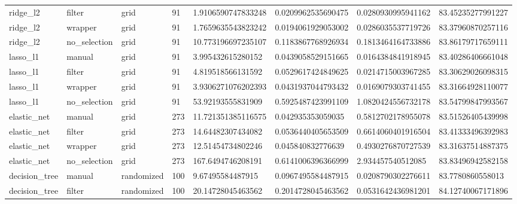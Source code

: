 {\begin{longtable}[c]{@{}llllllll@{}}
	\rowcolor[HTML]{EFEFEF} 
	ridge\_l2          & filter        & grid       & 91  & 1.9106590747833248     & 0.0209962535690475     & 0.0280930995941162     & 83.45235277991227  \\
	ridge\_l2          & wrapper       & grid       & 91  & 1.7659635543823242     & 0.0194061929053002     & 0.0286035537719726     & 83.37960870257116  \\
	\rowcolor[HTML]{EFEFEF} 
	ridge\_l2          & no\_selection & grid       & 91  & 10.773196697235107     & 0.1183867768926934     & 0.1813464164733886     & 83.86179717659111  \\* \midrule
	lasso\_l1          & manual        & grid       & 91  & 3.995432615280152      & 0.0439058529151665     & 0.0164384841918945     & 83.40286406661048  \\
	\rowcolor[HTML]{EFEFEF} 
	lasso\_l1          & filter        & grid       & 91  & 4.819518566131592      & 0.0529617424849625     & 0.0214715003967285     & 83.30629026098315  \\
	lasso\_l1          & wrapper       & grid       & 91  & 3.9306271076202393     & 0.0431937044793432     & 0.0169079303741455     & 83.31664928110077  \\
	\rowcolor[HTML]{EFEFEF} 
	lasso\_l1          & no\_selection & grid       & 91  & 53.92193555831909      & 0.5925487423991109     & 1.0820424556732178     & 83.54799847993567  \\* \midrule
	elastic\_net       & manual        & grid       & 273 & 11.721351385116575     & 0.042935353059035      & 0.5812702178955078     & 83.51526405439998  \\
	\rowcolor[HTML]{EFEFEF} 
	elastic\_net       & filter        & grid       & 273 & 14.64482307434082      & 0.0536440405653509     & 0.6614060401916504     & 83.41333496392983  \\
	elastic\_net       & wrapper       & grid       & 273 & 12.51454734802246      & 0.045840832776639      & 0.4930276870727539     & 83.31637514887375  \\
	\rowcolor[HTML]{EFEFEF} 
	elastic\_net       & no\_selection & grid       & 273 & 167.6494746208191      & 0.6141006396366999     & 2.934457540512085      & 83.83496942582158  \\* \midrule
	decision\_tree     & manual        & randomized & 100 & 9.67495584487915       & 0.0967495584487915     & 0.0208790302276611     & 83.7780860558013   \\
	\rowcolor[HTML]{EFEFEF} 
	decision\_tree     & filter        & randomized & 100 & 20.14728045463562      & 0.2014728045463562     & 0.0531642436981201     & 84.12740067171896  \\

\end{longtable}}
